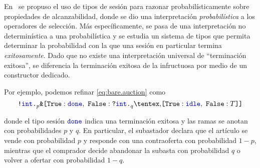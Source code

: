 En~\cite{DBLP:conf/concur/InversoMPTT20} se propuso el uso de tipos de sesión
para razonar probabilísticamente sobre propiedades de alcanzabilidad, donde se
dio una interpretación \emph{probabilística} a los operadores de selección. Más
específicamente, se pasa de una interpretación no determinística a una
probabilística y se estudia un sistema de tipos que permita determinar la
probabilidad con la que una sesión en particular termina \emph{exitosamente}.
Dado que no existe una interpretación universal de ``terminación exitosa'', se
diferencia la terminación exitosa de la infructuosa por medio de un constructor
dedicado.

Por ejemplo, podemos refinar \eqref{eq:bare.auction} como
\begin{equation}
    \label{eq:refined.auction}
    \Out\tint{
        \BinaryPBranch[p]\Done{
            \In\tint{
                \BinaryPChoice[q]\Idle\T
            }
        }
    }
\end{equation}

donde el tipo sesión $\Done$ indica una terminación exitosa y las
ramas  se anotan con probabilidades $p$ y $q$. En particular, el subastador
declara que el artículo se vende con probabilidad $p$ y  responde con una
contraoferta con probabilidad $1-p$, mientras que el comprador decide abandonar
la subasta con probabilidad $q$ o volver a ofertar con probabilidad $1-q$.
